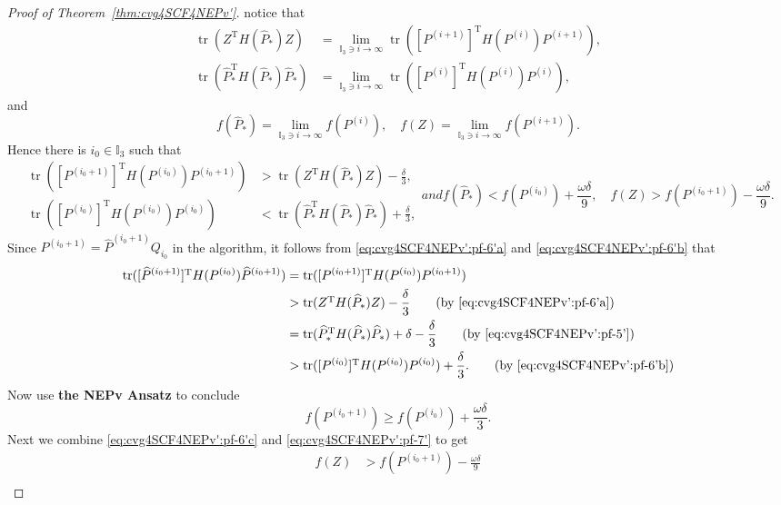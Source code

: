 \documentclass[11pt]{article}
\def\bbI{\mathbb{I}}
\def\what{\widehat}
\DeclareMathOperator{\tr}{tr}
\DeclareMathOperator{\T}{T}
\theoremstyle{definition}
\numberwithin{equation}{section}
\begin{document}
\begin{proof}[Proof of Theorem~\ref{thm:cvg4SCF4NEPv'}]
notice that
\begin{align*}
\tr(Z^{\T}H(\what P_*)Z)&=\lim_{\bbI_3\ni i\to\infty}\tr([P^{(i+1)}]^{\T}H(P^{(i)})P^{(i+1)}), \\
\tr(\what P_*^{\T}H(\what P_*)\what P_*)&=\lim_{\bbI_3\ni i\to\infty}\tr([P^{(i)}]^{\T}H(P^{(i)})P^{(i)}),
\end{align*}
and
$$
f(\what P_*)=\lim_{\bbI_3\ni i\to\infty}f(P^{(i)}), \quad
f(Z)=\lim_{\bbI_3\ni i\to\infty}f(P^{(i+1)}).
$$
Hence there is $i_0\in\bbI_3$ such that
\begin{subequations}\label{eq:cvg4SCF4NEPv':pf-6'}
\begin{align}
\tr([P^{(i_0+1)}]^{\T}H(P^{(i_0)})P^{(i_0+1)})
    &>\tr(Z^{\T}H(\what P_*)Z)-\frac {\delta}3, \label{eq:cvg4SCF4NEPv':pf-6'a} \\
\tr([P^{(i_0)}]^{\T}H(P^{(i_0)})P^{(i_0)})
    &<\tr(\what P_*^{\T}H(\what P_*)\what P_*)+\frac {\delta}3, \label{eq:cvg4SCF4NEPv':pf-6'b}
\end{align}
and
\begin{equation}\label{eq:cvg4SCF4NEPv':pf-6'c}
f(\what P_*)<f(P^{(i_0)})+\frac {\omega\delta}9, \quad
f(Z)>f(P^{(i_0+1)})-\frac {\omega\delta}9.
\end{equation}
\end{subequations}
Since $P^{(i_0+1)}=\what P^{(i_0+1)}Q_{i_0}$ in the algorithm, it follows from \eqref{eq:cvg4SCF4NEPv':pf-6'a}
and \eqref{eq:cvg4SCF4NEPv':pf-6'b} that
\begin{align*}
\tr([\what P^{(i_0+1)}]^{\T}H(P^{(i_0)})\what P^{(i_0+1)})
  &=\tr([P^{(i_0+1)}]^{\T}H(P^{(i_0)})P^{(i_0+1)}) \\
  &>\tr(Z^{\T}H(\what P_*)Z)-\frac {\delta}3 \qquad (\mbox{by \eqref{eq:cvg4SCF4NEPv':pf-6'a}})\\
  &=\tr(\what P_*^{\T}H(\what P_*)\what P_*)+\delta-\frac {\delta}3 \qquad (\mbox{by \eqref{eq:cvg4SCF4NEPv':pf-5'}}) \\
  &>\tr([P^{(i_0)}]^{\T}H(P^{(i_0)})P^{(i_0)})+\frac {\delta}3. \qquad (\mbox{by \eqref{eq:cvg4SCF4NEPv':pf-6'b}})
\end{align*}
Now use {\bf the NEPv Ansatz} to conclude
\begin{equation}\label{eq:cvg4SCF4NEPv':pf-7'}
f(P^{(i_0+1)})\ge f(P^{(i_0)})+\frac {\omega\delta}3.
\end{equation}
Next we combine \eqref{eq:cvg4SCF4NEPv':pf-6'c} and \eqref{eq:cvg4SCF4NEPv':pf-7'} to get
\begin{align*}
f(Z)&>f(P^{(i_0+1)})-\frac {\omega\delta}9 \\

\end{align*}
\end{proof}
\end{document}
